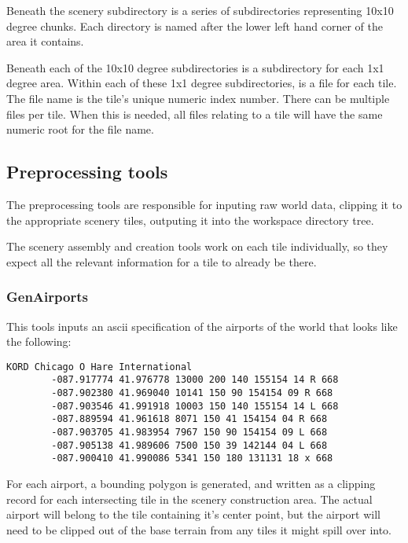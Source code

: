 \documentclass[12pt]{article}
\begin{document}
Beneath the scenery subdirectory is a series of subdirectories
representing 10x10 degree chunks.  Each directory is named after the
lower left hand corner of the area it contains.

Beneath each of the 10x10 degree subdirectories is a subdirectory for
each 1x1 degree area.  Within each of these 1x1 degree subdirectories,
is a file for each tile.  The file name is the tile's unique numeric
index number.  There can be multiple files per tile.  When this is
needed, all files relating to a tile will have the same numeric root
for the file name.

\subsection{Preprocessing tools}

The preprocessing tools are responsible for inputing raw world data,
clipping it to the appropriate scenery tiles, outputing it into the
workspace directory tree.

The scenery assembly and creation tools work on each tile
individually, so they expect all the relevant information for a tile
to already be there.

\subsubsection{GenAirports}

This tools inputs an ascii specification of the airports of the world
that looks like the following:

\begin{verbatim}
KORD Chicago O Hare International                       
        -087.917774 41.976778 13000 200 140 155154 14 R 668
        -087.902380 41.969040 10141 150 90 154154 09 R 668
        -087.903546 41.991918 10003 150 140 155154 14 L 668
        -087.889594 41.961618 8071 150 41 154154 04 R 668
        -087.903705 41.983954 7967 150 90 154154 09 L 668 
        -087.905138 41.989606 7500 150 39 142144 04 L 668
        -087.900410 41.990086 5341 150 180 131131 18 x 668
\end{verbatim}

For each airport, a bounding polygon is generated, and written as a
clipping record for each intersecting tile in the scenery construction
area.  The actual airport will belong to the tile containing it's
center point, but the airport will need to be clipped out of the base
terrain from any tiles it might spill over into.
\end{document}
